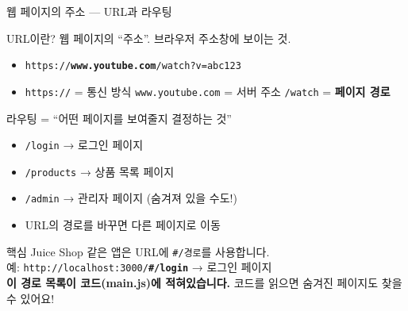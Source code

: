 \documentclass[aspectratio=169,10pt]{beamer}
\newcommand{\hlt}[1]{\textcolor{accent}{\textbf{#1}}}
\begin{document}
\begin{frame}[shrink=5]{웹 페이지의 주소 — URL과 라우팅}

\begin{block}{URL이란?}
웹 페이지의 ``주소''. 브라우저 주소창에 보이는 것.
\begin{itemize}
    \item \texttt{https://\hlt{www.youtube.com}/watch?v=abc123}
    \item \texttt{https://} = 통신 방식 \quad \texttt{www.youtube.com} = 서버 주소 \quad \texttt{/watch} = \hlt{페이지 경로}
\end{itemize}
\end{block}

\vspace{0.3em}
\begin{block}{라우팅 = ``어떤 페이지를 보여줄지 결정하는 것''}
\begin{itemize}
    \item \texttt{/login} → 로그인 페이지
    \item \texttt{/products} → 상품 목록 페이지
    \item \texttt{/admin} → 관리자 페이지 (숨겨져 있을 수도!)
    \item URL의 경로를 바꾸면 다른 페이지로 이동
\end{itemize}
\end{block}

\vspace{0.3em}
\begin{alertblock}{핵심}
Juice Shop 같은 앱은 URL에 \texttt{\#/경로}를 사용합니다.\\
예: \texttt{http://localhost:3000/\hlt{\#/login}} → 로그인 페이지\\
\hlt{이 경로 목록이 코드(main.js)에 적혀있습니다.} 코드를 읽으면 숨겨진 페이지도 찾을 수 있어요!
\end{alertblock}
\end{frame}
\end{document}
